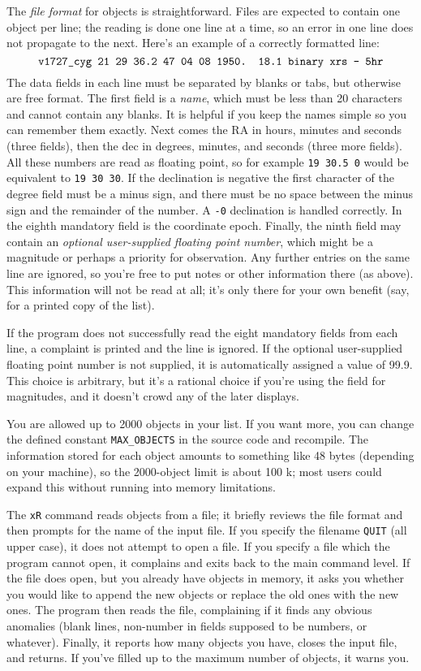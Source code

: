 The {\it file format} for objects is straightforward.
Files are expected to contain one object per line; the reading is 
done one line at a time, so an error in one line does not propagate 
to the next.   Here's an example of a correctly
formatted line: 
$$\hbox{\tt v1727\_cyg  21 29 36.2   47 04 08  1950. 18.1  binary xrs - 5hr}$$
The data fields in each line must be separated by
blanks or tabs, but otherwise are free format.  The first field
is a {\it name}, which must be less than 20 characters and cannot
contain any blanks.  It is helpful if you keep the names simple
so you can remember them exactly.
Next comes the RA in hours, minutes and seconds
(three fields), then the dec in degrees, minutes, and seconds (three
more fields).  All these numbers are read as floating point, so
for example {\tt 19 30.5 0} would be equivalent to {\tt 19 30 30}.
If the declination is negative the first character of the degree
field must be a minus sign, and there must be no space between the
minus sign and the remainder of the number.  A {\tt -0} declination 
is handled correctly.  In the eighth mandatory field is the coordinate
epoch.  Finally, the ninth field may contain an {\it optional user-supplied
floating point number}, which might be a magnitude or perhaps a priority
for observation.  Any further entries on the same line are ignored,
so you're free to put notes or other information there (as above).  
This information
will not be read at all; it's only there for your own benefit (say,
for a printed copy of the list).  

If the program does not successfully
read the eight mandatory fields from each line, a complaint is 
printed and the line
is ignored.  If the optional user-supplied floating point number is
not supplied, it is automatically assigned a value of 99.9.  This choice
is arbitrary, but it's 
a rational choice if you're using the field for magnitudes, and it
doesn't crowd any of the later displays.  
 
You are allowed up to 2000 objects in your list.  If you want more, you
can change the defined constant {\tt MAX\_OBJECTS} in the source code
and recompile.  The information stored for each object amounts to 
something like 48 bytes (depending on your machine), so the 2000-object
limit is about 100 k; most users could expand this without running into 
memory limitations.

The {\tt xR} command reads objects from a file; it briefly reviews the
file format and then prompts for
the name of the input file. If you specify the
filename {\tt QUIT} (all upper case), it does not attempt to open
a file.  If you specify a file which the program cannot open, it complains and 
exits back to the main command level.  If the file does open,
but you already have objects
in memory, it asks you whether you would like to append the new 
objects or replace the old ones with the new ones.  The program then
reads the file, complaining if it finds any obvious anomalies (blank lines,
non-number in fields supposed to be numbers, or whatever).  Finally, it
reports how many objects you have, closes the input file, and returns.
If you've filled up to the maximum number of objects, it warns you.

